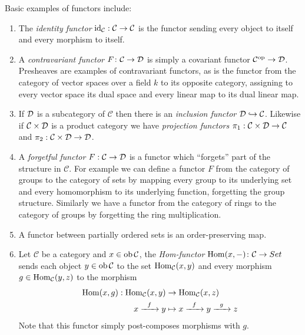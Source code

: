 \documentclass[a4paper,openany]{scrbook}
\renewcommand{\C}{\mathcal C}
\begin{document}
\begin{example}
Basic examples of functors include:
\begin{enumerate}[label=\alph*)]
\item The \emph{identity functor} $\id_\C : \C \to \C$ is the functor sending every object to itself and every morphism to itself.
\item A \emph{contravariant functor} $F\colon \C \to \D$ is simply a covariant functor $\C^\op \to \D$. Presheaves are examples of contravariant functors, as is the functor from the category of vector spaces over a field $k$ to its opposite category, assigning to every vector space its dual space and every linear map to its dual linear map. 
\item If $\mathcal D$ is a subcategory of $\C$ then there is an \emph{inclusion functor} $\D \hookrightarrow \C$. Likewise if $\C \times \D$ is a product category we have \emph{projection functors} $\pi_1 : \C \times \D \to \C$ and $\pi_2 : \C \times \D \to \D$.
\item A \emph{forgetful functor} $F:\C \to \D$ is a functor which ``forgets'' part of the structure in $\C$. For example we can define a functor $F$ from the category of groups to the category of sets by mapping every group to its underlying set and every homomorphism to its underlying function, forgetting the group structure. Similarly we have a functor from the category of rings to the category of groups by forgetting the ring multiplication. 
\item A functor between partially ordered sets is an order-preserving map.
\item Let $\C$ be a category and $x \in \ob \C$, the \emph{Hom-functor} $\Hom(x, -)\colon\C \to \\Set$ sends each object $y \in \ob \C$ to the set $\Hom_{\C}(x,y)$ and every morphism $g \in \Hom_{\C}(y,z)$ to the morphism 
\begin{align*}
\displaystyle \Hom(x,g): \Hom_{\C}(x,y) &\to \Hom_{\C}(x,z) \\
x \xrightarrow{\hspace{0.2cm} f \hspace{0.2cm}} y &\mapsto x \xrightarrow{\hspace{0.2cm} f \hspace{0.2cm}} y \xrightarrow{\hspace{0.2cm} g \hspace{0.2cm}} z
\end{align*} \noindent
Note that this functor simply post-composes morphisms with $g$.
\end{enumerate}
\end{example}
\end{document}
